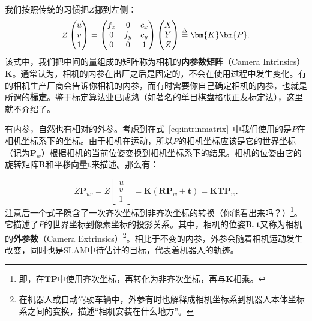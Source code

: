 我们按照传统的习惯把$Z$挪到左侧：
\begin{equation}
Z \begin{pmatrix} u\\ v\\ 1 \end{pmatrix}= \begin{pmatrix} f_x & 0&c_x \\ 0& f_y& c_y\\ 0&0 & 1 \end{pmatrix}\begin{pmatrix} X\\ Y\\ Z \end{pmatrix} 
\buildrel \Delta \over = \bm{K} \bm{P}.
\end{equation}
该式中，我们把中间的量组成的矩阵称为相机的\textbf{内参数矩阵}（Camera Intrinsics）$\bm{K}$。通常认为，相机的内参在出厂之后是固定的，不会在使用过程中发生变化。有的相机生产厂商会告诉你相机的内参，而有时需要你自己确定相机的内参，也就是所谓的\textbf{标定}。鉴于标定算法业已成熟（如著名的单目棋盘格张正友标定法\textsuperscript{\cite{Zhang1999}}），这里就不介绍了。

有内参，自然也有相对的外参。考虑到在式~\eqref{eq:intrinmatrix}~中我们使用的是$P$在相机坐标系下的坐标。由于相机在运动，所以$P$的相机坐标应该是它的世界坐标（记为$\bm{P}_w$）根据相机的当前位姿变换到相机坐标系下的结果。相机的位姿由它的旋转矩阵$\bm{R}$和平移向量$\bm{t}$来描述。那么有：

\begin{equation}
\label{eq:cameraprojection}
Z \bm{P}_{uv}=
Z \left[ \begin{array}{l}
u\\
v\\
1
\end{array} \right] = \bm{K} \left( {\bm{R}{ \bm{P}_w} + \bm{t}} \right) =  \bm{K} \bm{T} \bm{P}_w .
\end{equation}
注意后一个式子隐含了一次齐次坐标到非齐次坐标的转换（你能看出来吗？）\footnote{即，在$\bm{T}\bm{P}$中使用齐次坐标，再转化为非齐次坐标，再与$\bm{K}$相乘。}。它描述了$P$的世界坐标到像素坐标的投影关系。其中，相机的位姿$\bm{R},\bm{t}$又称为相机的\textbf{外参数}（Camera Extrinsics）\footnote{在机器人或自动驾驶车辆中，外参有时也解释成相机坐标系到机器人本体坐标系之间的变换，描述“相机安装在什么地方”。}。相比于不变的内参，外参会随着相机运动发生改变，同时也是SLAM中待估计的目标，代表着机器人的轨迹。
%

